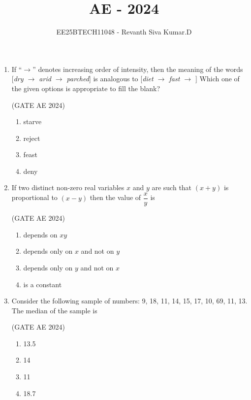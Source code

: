 \documentclass[journal,12pt,onecolumn]{IEEEtran}
\title{\LARGE \textbf{AE - 2024}}
\author{\Large EE25BTECH11048 - Revanth Siva Kumar.D}
\date{}
\theoremstyle{remark}
\begin{document}
\maketitle
\begin{flushleft}

\begin{enumerate}

\item If ``$\rightarrow$'' denotes increasing order of intensity, then the meaning of the words 
[\textit{dry $\rightarrow$ arid $\rightarrow$ parched}] is analogous to [\textit{diet $\rightarrow$ fast $\rightarrow$ \underline{\hspace{1.5cm}}}] 
Which one of the given options is appropriate to fill the blank?

\hfill(GATE AE 2024)

\begin{enumerate}
    \item starve
    \item reject
    \item feast
    \item deny
\end{enumerate}

\item If two distinct non-zero real variables $x$ and $y$ are such that $(x + y)$ is proportional to $(x - y)$ then the value of $\dfrac{x}{y}$ is

\hfill(GATE AE 2024)

\begin{enumerate}
    \item depends on $xy$ 
    \item depends only on $x$ and not on $y$
    \item depends only on $y$ and not on $x$ 
    \item is a constant
\end{enumerate}

\item Consider the following sample of numbers: 9, 18, 11, 14, 15, 17, 10, 69, 11, 13. The median of the sample is

\hfill(GATE AE 2024)

\begin{enumerate}
    \item 13.5
    \item 14
    \item 11
    \item 18.7
\end{enumerate}


\end{enumerate}
\end{flushleft}
\end{document}
